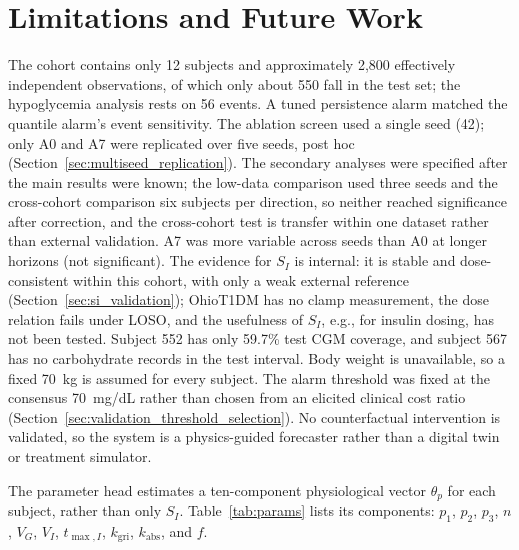 \documentclass[journal]{IEEEtran}
\begin{document}
\section{Limitations and Future Work}

The cohort contains only 12 subjects and approximately 2,800 effectively independent observations, of which only about 550 fall in the test set; the hypoglycemia analysis rests on 56 events. A tuned persistence alarm matched the quantile alarm's event sensitivity. The ablation screen used a single seed (42); only A0 and A7 were replicated over five seeds, post hoc (Section~\ref{sec:multiseed_replication}). The secondary analyses were specified after the main results were known; the low-data comparison used three seeds and the cross-cohort comparison six subjects per direction, so neither reached significance after correction, and the cross-cohort test is transfer within one dataset rather than external validation. A7 was more variable across seeds than A0 at longer horizons (not significant). The evidence for $S_I$ is internal: it is stable and dose-consistent within this cohort, with only a weak external reference (Section~\ref{sec:si_validation}); OhioT1DM has no clamp measurement, the dose relation fails under LOSO, and the usefulness of $S_I$, e.g., for insulin dosing, has not been tested. Subject 552 has only 59.7\% test CGM coverage, and subject 567 has no carbohydrate records in the test interval. Body weight is unavailable, so a fixed 70~kg is assumed for every subject. The alarm threshold was fixed at the consensus 70~mg/dL rather than chosen from an elicited clinical cost ratio (Section~\ref{sec:validation_threshold_selection}). No counterfactual intervention is validated, so the system is a physics-guided forecaster rather than a digital twin or treatment simulator.

The parameter head estimates a ten-component physiological vector $\theta_p$ for each subject, rather than only $S_I$. Table~\ref{tab:params} lists its components: $p_1$, $p_2$, $p_3$, $n$, $V_G$, $V_I$, $t_{\max,I}$, $k_{\text{gri}}$, $k_{\text{abs}}$, and $f$.
\end{document}
